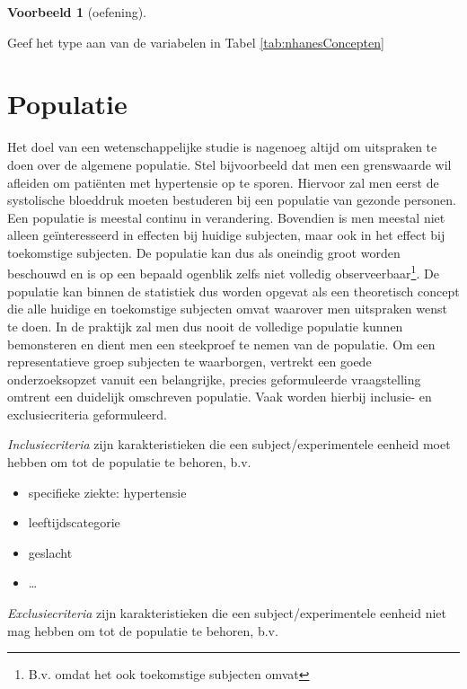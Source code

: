 \documentclass[
  12pt,dutch]{book}
\providecommand{\tightlist}{%
  \setlength{\itemsep}{0pt}\setlength{\parskip}{0pt}}
\theoremstyle{definition}
\theoremstyle{definition}
\newtheorem{example}{Voorbeeld}[chapter]
\theoremstyle{definition}
\theoremstyle{definition}
\theoremstyle{remark}
\begin{document}
\begin{example}[oefening]
\protect\hypertarget{exm:unnamed-chunk-30}{}\label{exm:unnamed-chunk-30}~
\end{example}

Geef het type aan van de variabelen in Tabel \ref{tab:nhanesConcepten}

\section{Populatie}\label{subsec:pop}

Het doel van een wetenschappelijke studie is nagenoeg altijd om uitspraken te doen over de algemene populatie.
Stel bijvoorbeeld dat men een grenswaarde wil afleiden om patiënten met hypertensie op te sporen.
Hiervoor zal men eerst de systolische bloeddruk moeten bestuderen bij een populatie van gezonde personen.
Een populatie is meestal continu in verandering.
Bovendien is men meestal niet alleen geïnteresseerd in effecten bij huidige subjecten, maar ook in het effect bij toekomstige subjecten.
De populatie kan dus als oneindig groot worden beschouwd en is op een bepaald ogenblik zelfs niet volledig observeerbaar\footnote{B.v. omdat het ook toekomstige subjecten omvat}.
De populatie kan binnen de statistiek dus worden opgevat als een theoretisch concept die alle huidige en toekomstige subjecten omvat waarover men uitspraken wenst te doen.
In de praktijk zal men dus nooit de volledige populatie kunnen bemonsteren en dient men een steekproef te nemen van de populatie.
Om een representatieve groep subjecten te waarborgen, vertrekt een goede onderzoeksopzet vanuit een belangrijke, precies geformuleerde vraagstelling
omtrent een duidelijk omschreven populatie.
Vaak worden hierbij inclusie- en exclusiecriteria geformuleerd.

\emph{Inclusiecriteria} zijn karakteristieken die een subject/experimentele eenheid moet hebben om tot de populatie te behoren, b.v.

\begin{itemize}
\tightlist
\item
  specifieke ziekte: hypertensie
\item
  leeftijdscategorie
\item
  geslacht
\item
  \ldots{}
\end{itemize}

\emph{Exclusiecriteria} zijn karakteristieken die een subject/experimentele eenheid niet mag hebben om tot de populatie te behoren, b.v.
\end{document}
